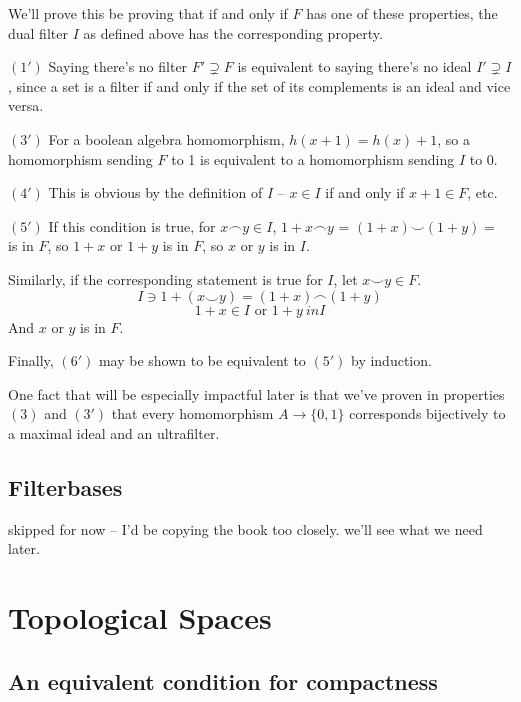 \documentclass{article}
\begin{document}
      We'll prove this be proving that if and only if $F$ has one of these
      properties, the dual filter $I$ as defined above has the corresponding
      property.

      $(1')$ Saying there's no filter $F' \supsetneq F$ is equivalent to saying
      there's no ideal $I' \supsetneq I$, since a set is a filter if and only if
      the set of its complements is an ideal and vice versa.

      $(3')$ For a boolean algebra homomorphism, $h(x+1) = h(x) + 1$, so a
      homomorphism sending $F$ to 1 is equivalent to a homomorphism sending $I$
      to 0.

      $(4')$ This is obvious by the definition of $I$ -- $x \in I$ if and only
      if $x+1 \in F$, etc.

      $(5')$ If this condition is true, for $x \frown y \in I$, $1+ x \frown y$
      = $(1+x) \smile (1+y) = $ is in $F$, so $1+x$ or $1+y$ is in $F$, so $x$
      or $y$ is in $I$.

      Similarly, if the corresponding statement is true for $I$, let $x \smile y
      \in F$.
      \[I \ni 1 + (x \smile y) = (1 + x) \frown (1 + y)\]
      \[1 + x \in I \text{ or } 1 + y \ in I\]
      And $x$ or $y$ is in $F$.

      Finally, $(6')$ may be shown to be equivalent to $(5')$ by induction.

      One fact that will be especially impactful later is that we've proven in
      properties $(3)$ and $(3')$ that every homomorphism $A \rightarrow
      \{0,1\}$ corresponds bijectively to a maximal ideal and an ultrafilter.

      \subsection{Filterbases}

        skipped for now -- I'd be copying the book too closely. we'll see what
        we need later.



      







    \section{Topological Spaces}

      \subsection{An equivalent condition for compactness}
\end{document}
